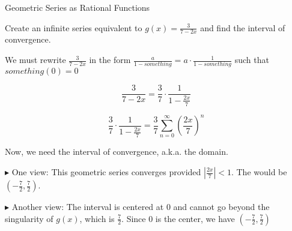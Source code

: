 \documentclass{ximera}
\begin{document}
\begin{example} Geometric Series as Rational Functions



Create an infinite series equivalent to $g(x)=\frac{3}{7 - 2x}$ and find the interval of convergence.



\begin{explanation}


We must rewrite $\frac{3}{7 - 2x}$ in the form $\frac{a}{1-something} = a \cdot \frac{1}{1-something}$ such that $something(0) = 0$




\[     \frac{3}{7 - 2x}  =   \frac{3}{7} \cdot \frac{1}{1 - \frac{2x}{7}}   \]



\[  \frac{3}{7} \cdot \frac{1}{1 - \frac{2x}{7}} =  \frac{3}{7} \sum\limits_{n=0}^{\infty} \left(\frac{2x}{7}\right)^n       \]





Now, we need the interval of convergence, a.k.a. the domain.  


$\blacktriangleright$ One view:  This geometric series converges provided   $\left| \frac{2x}{7} \right| < 1$.  The would be $\left(-\frac{7}{2}, \frac{7}{2} \right)$.



$\blacktriangleright$ Another view: The interval is centered at $0$ and cannot go beyond the singularity of $g(x)$, which is $\frac{7}{2}$.  Since $0$ is the center, we have $\left(-\frac{7}{2}, \frac{7}{2} \right)$


\end{explanation}





\end{example}
\end{document}
